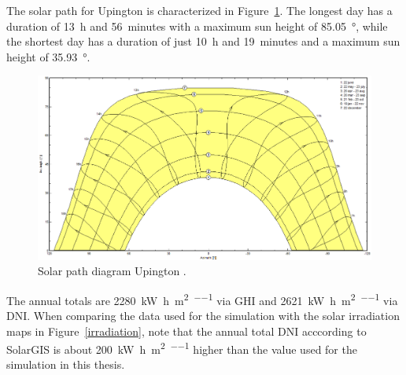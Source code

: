 The solar path for Upington is characterized in Figure~\ref{SunPathUpington}. The longest day has a duration of \SI{13}{h} and \SI{56}{minutes} with a maximum sun height of \SI{85.05}{\degree}, while the shortest day has a duration of just \SI{10}{h} and \SI{19}{minutes} and a maximum sun height of \SI{35.93}{\degree}.

\begin{figure}[htbp]  
\centering
\includegraphics[width=1\linewidth]{FIG/SunPathUpington}
\caption[Solar path diagram for Upington.]{Solar path diagram Upington \cite{PVsystSA2015}.}\label{SunPathUpington}
\end{figure}
\pagebreak

The annual totals are \SI{2280}{\kilo\watt\hour\per\square\metre\per\year} via \ac{GHI} and \SI{2621}{\kilo\watt\hour\per\square\metre\per\year} via \ac{DNI}. When comparing the data used for the simulation with the solar irradiation maps in Figure~\ref{irradiation}, note that the annual total \ac{DNI} acccording to SolarGIS \cite{SolarGIS2015b} is about \SI{200}{\kilo\watt\hour\per\square\metre\per\year} higher than the value used for the simulation in this thesis.

